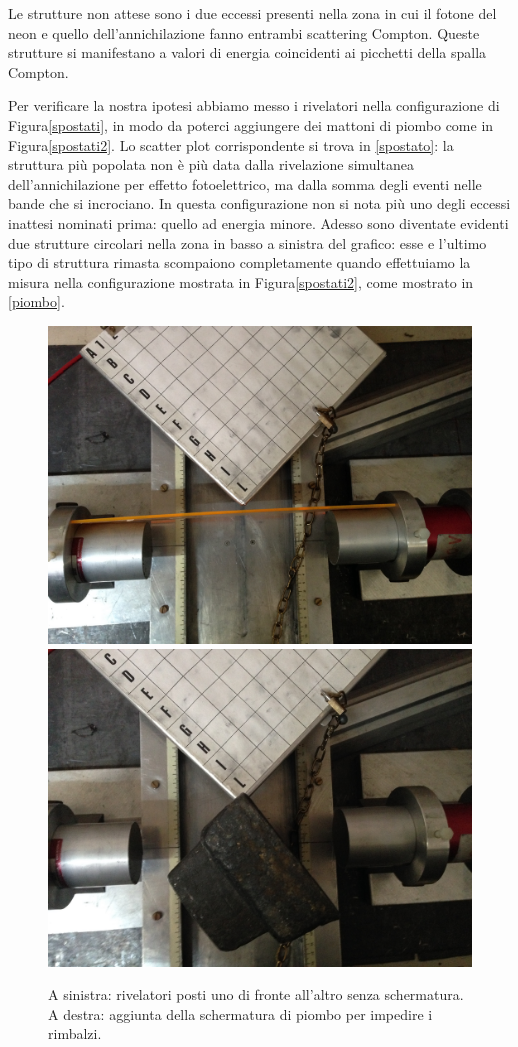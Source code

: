 
Le strutture non attese sono i due eccessi presenti nella zona in cui il fotone del neon e quello dell'annichilazione fanno entrambi scattering Compton. Queste strutture si manifestano a valori di energia coincidenti ai picchetti della spalla Compton.

Per verificare la nostra ipotesi abbiamo messo i rivelatori nella configurazione di Figura\autoref{spostati}, in modo da poterci aggiungere dei mattoni di piombo come in Figura\autoref{spostati2}. 
Lo scatter plot corrispondente si trova in \autoref{spostato}: la struttura più popolata non è più data dalla rivelazione simultanea dell'annichilazione per effetto fotoelettrico, ma dalla somma degli eventi nelle bande che si incrociano.
In questa configurazione non si nota più uno degli eccessi inattesi nominati prima: quello ad energia minore.
Adesso sono diventate evidenti due strutture circolari nella zona in basso a sinistra del grafico: esse e l'ultimo tipo di struttura rimasta scompaiono completamente quando effettuiamo la misura nella configurazione mostrata in Figura\autoref{spostati2}, come mostrato in \autoref{piombo}.

\begin{figure}[h]
\centering
\subfloat
{\includegraphics[width=17 em]{immagini/alter} \label{spostati} }
\subfloat
{\includegraphics[width=17 em]{immagini/spostati2} \label{spostati2}}
\caption{A sinistra: rivelatori posti uno di fronte all'altro senza schermatura. A destra: aggiunta della schermatura di piombo per impedire i rimbalzi.}
\end{figure}

